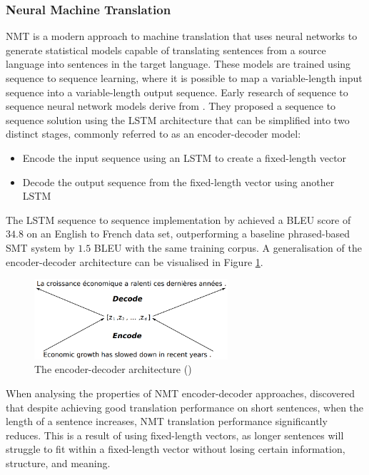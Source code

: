 \subsubsection{Neural Machine Translation}

\acrfull{NMT} is a modern approach to machine translation that uses neural networks to generate statistical models capable of translating sentences from a source language into sentences in the target language.
These models are trained using sequence to sequence learning, where it is possible to map a variable-length input sequence into a variable-length output sequence. %
Early research of sequence to sequence neural network models derive from \cite{sutskever_sequence_2014}. They proposed a sequence to sequence solution using the \acrshort{LSTM} architecture that can be simplified into two distinct stages, commonly referred to as an encoder-decoder model:
\begin{itemize}
    \item Encode the input sequence using an \acrshort{LSTM} to create a fixed-length vector
    \item Decode the output sequence from the fixed-length vector using another \acrshort{LSTM}
\end{itemize}

The \acrshort{LSTM} sequence to sequence implementation by \cite{sutskever_sequence_2014} achieved a \acrshort{BLEU} score of $34.8$ on an English to French data set, outperforming a baseline phrased-based \acrshort{SMT} system by $1.5$ \acrshort{BLEU} with the same training corpus.
A generalisation of the encoder-decoder architecture can be visualised in Figure \ref{fig:encoder_decoder}.
\begin{figure}[ht!]
\centering
\includegraphics[width=0.64\textwidth]{media/literature/machine_translation/mt_encoder-decoder.png}
\caption[Diagram of the encoder-decoder architecture]{The encoder-decoder architecture (\cite{cho_properties_2014})}
\label{fig:encoder_decoder}
\end{figure}


When analysing the properties of \acrshort{NMT} encoder-decoder approaches, \cite{cho_properties_2014} discovered that despite achieving good translation performance on short sentences, when the length of a sentence increases, \acrshort{NMT} translation performance significantly reduces. This is a result of using fixed-length vectors, as longer sentences will struggle to fit within a fixed-length vector without losing certain information, structure, and meaning.

